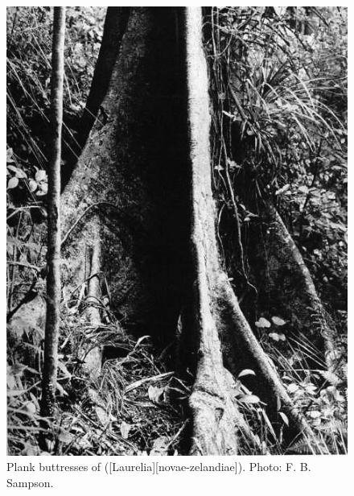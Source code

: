 \begin{figure}[t]
	\begin{minipage}[t]{\textwidth}
		\begin{minipage}[t]{(\textwidth-\fgap-\fgap) * \real{0.342}}
			\centering
			\includegraphics[width=\textwidth]{graphics/fig_009}
			\caption[Plank buttresses of pukatea]{Plank buttresses of  ([Laurelia][novae-zelandiae]).
			Photo:  F. B. Sampson.}%
			\label{fig:9buttresses}
		\end{minipage}\hspace{\fgap}%
		\begin{minipage}[t]{(\textwidth-\fgap-\fgap) * \real{0.362}}
			\centering

\end{minipage}
\end{minipage}
\end{figure}
